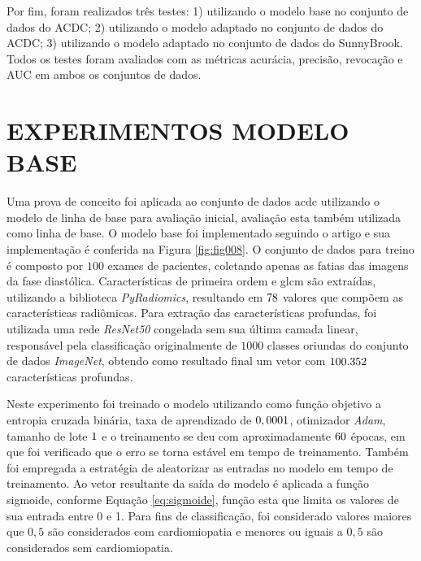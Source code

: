 Por fim, foram realizados três testes: 1) utilizando o modelo base no conjunto de dados do ACDC; 2) utilizando o modelo adaptado no conjunto de dados do ACDC; 3) utilizando o modelo adaptado no conjunto de dados do SunnyBrook. Todos os testes foram avaliados com as métricas acurácia, precisão, revocação e AUC em ambos os conjuntos de dados.

\section{EXPERIMENTOS MODELO BASE}
\label{sec:cap5_experimentos_base}

Uma prova de conceito foi aplicada ao conjunto de dados \gls{acdc} utilizando o modelo de linha de base para avaliação inicial, avaliação esta também utilizada como linha de base. O modelo base foi implementado seguindo o artigo e sua implementação é conferida na Figura \ref{fig:fig008}. O conjunto de dados para treino é composto por $100$ exames de pacientes, coletando apenas as fatias das imagens da fase diastólica. Características de primeira ordem e \gls{glcm} são extraídas, utilizando a biblioteca \textit{PyRadiomics}, resultando em $78$ valores que compõem as características radiômicas. Para extração das características profundas, foi utilizada uma rede \textit{ResNet50} congelada sem sua última camada linear, responsável pela classificação originalmente de $1000$ classes oriundas do conjunto de dados \textit{ImageNet}, obtendo como resultado final um vetor com $100.352$ características profundas.


Neste experimento foi treinado o modelo utilizando como função objetivo a entropia cruzada binária, taxa de aprendizado de $0,0001$, otimizador \textit{Adam}, tamanho de lote $1$ e o treinamento se deu com aproximadamente $60$ épocas, em que foi verificado que o erro se torna estável em tempo de treinamento. Também foi empregada a estratégia de aleatorizar as entradas no modelo em tempo de treinamento. Ao vetor resultante da saída do modelo é aplicada a função sigmoide, conforme Equação \ref{eq:sigmoide}, função esta que limita os valores de sua entrada entre 0 e 1. Para fins de classificação, foi considerado valores maiores que $0,5$ são considerados com cardiomiopatia e menores ou iguais a $0,5$ são considerados sem cardiomiopatia.

